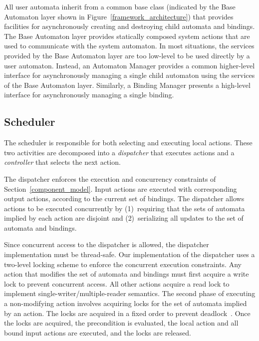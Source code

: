 All user automata inherit from a common base class (indicated by the Base Automaton layer shown in Figure~\ref{framework_architecture}) that provides facilities for asynchronously creating and destroying child automata and bindings.
The Base Automaton layer provides statically composed system actions that are used to communicate with the system automaton.
In most situations, the services provided by the Base Automaton layer are too low-level to be used directly by a user automaton.
Instead, an Automaton Manager provides a common higher-level interface for asynchronously managing a single child automaton using the services of the Base Automaton layer.
Similarly, a Binding Manager presents a high-level interface for asynchronously managing a single binding.

\subsection{Scheduler\label{scheduling}}

The scheduler is responsible for both selecting and executing local actions.
These two activities are decomposed into a \emph{dispatcher} that executes actions and a \emph{controller} that selects the next action.

The dispatcher enforces the execution and concurrency constraints of Section~\ref{component_model}.
Input actions are executed with corresponding output actions, according to the current set of bindings.
The dispatcher allows actions to be executed concurrently by (1)~requiring that the sets of automata implied by each action are disjoint and (2)~serializing all updates to the set of automata and bindings.

Since concurrent access to the dispatcher is allowed, the dispatcher implementation must be thread-safe.
Our implementation of the dispatcher uses a two-level locking scheme to enforce the concurrent execution constraints.
Any action that modifies the set of automata and bindings must first acquire a write lock to prevent concurrent access.
All other actions acquire a read lock to implement single-writer/multiple-reader semantics.
The second phase of executing a non-modifying action involves acquiring locks for the set of automata implied by an action.
The locks are acquired in a fixed order to prevent deadlock~\cite{havender1968avoiding}.
Once the locks are acquired, the precondition is evaluated, the local action and all bound input actions are executed, and the locks are released.

